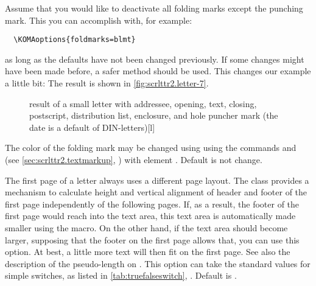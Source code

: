 %
\begin{Example}
  Assume that you would like to deactivate all folding marks except the punching
  mark.  This you can accomplish with, for example:
\begin{lstlisting}
  \KOMAoptions{foldmarks=blmt}
\end{lstlisting}
  as long as the defaults have not been changed previously. If some changes
  might have been made before, a safer method should be used. This changes our
  example a little bit:
  The result is shown in \autoref{fig:scrlttr2.letter-7}.
  \begin{figure}
    \setcapindent{0pt}%
    \begin{captionbeside}{%
        result of a small letter with addressee, opening, text, closing,
        postscript, distribution list, enclosure, and hole puncher mark
        (the date is a default of DIN-letters)}[l]
    \end{captionbeside}
    \label{fig:scrlttr2.letter-7}
  \end{figure}
\end{Example}
%
The color of the folding mark may be changed
using using the commands
 and  (see
\autoref{sec:scrlttr2.textmarkup},
) with element
. Default is not change.%
%
%
%

\begin{Declaration}
\end{Declaration}
%
The first page of a letter always uses a different page layout. The
 class provides a mechanism to calculate height and vertical
alignment of header and footer of the first page independently of the
following pages. If, as a result, the footer of the first page would reach
into the text area, this text area is automatically made smaller using the
 macro. On the other hand, if
the text area should become larger, supposing that the footer on the first
page allows that, you can use this option. At best, a little more text will
then fit on the first page. See also the description of the pseudo-length
 on
.  This option can
take the standard values for simple switches, as listed in
\autoref{tab:truefalseswitch}, . Default is
.
%
%

